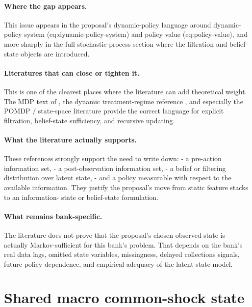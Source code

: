 \documentclass[11pt]{article}
\begin{document}
\paragraph{Where the gap appears.}
This issue appears in the proposal's dynamic-policy language around
dynamic-policy system (eq:dynamic-policy-system) and policy value
(eq:policy-value), and more sharply in the full stochastic-process section where
the filtration and belief-state objects are introduced.

\paragraph{Literatures that can close or tighten it.}
This is one of the clearest places where the literature can add theoretical
weight. The MDP text of \citet{puterman1994mdp}, the dynamic treatment-regime
reference \citet{murphy2003dynamic}, and especially the POMDP / state-space
literature \citep{smallwood1973pomdp,kaelbling1998pomdp,
ledoux2005recursivefilters,durbinkoopman2012ssm,westharrison1997bfdm} provide
the correct language for explicit filtration, belief-state sufficiency, and
recursive updating.

\paragraph{What the literature actually supports.}
These references strongly support the need to write down:
- a pre-action information set,
- a post-observation information set,
- a belief or filtering distribution over latent state,
- and a policy measurable with respect to the available information.
They justify the proposal's move from static feature stacks to an information-
state or belief-state formulation.

\paragraph{What remains bank-specific.}
The literature does not prove that the proposal's chosen observed state is
actually Markov-sufficient for this bank's problem. That depends on the bank's
real data lags, omitted state variables, missingness, delayed collections
signals, future-policy dependence, and empirical adequacy of the latent-state
model.

\section{Shared macro common-shock state}
\end{document}

